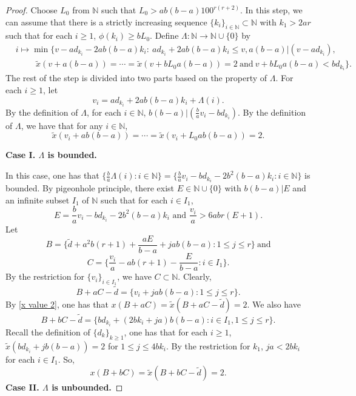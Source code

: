 \documentclass[reqno,12pt]{amsart}
\def \N {\mathbb N}
\numberwithin{equation}{section}
\begin{document}
\begin{proof}
	Choose $L_0$ from $\N$ such that $L_0>ab(b-a)100^{r(r+2)}$.
	In this step, we can assume that there is a strictly increasing sequence $\{k_i\}_{i\in \N}\subset \N$ with $k_1>2ar$ such that for each $i\ge 1$, $\phi(k_i)\ge bL_0$. Define $\Lambda:\N\to\N\cup \{0\}$ by
	\begin{align*}
		& i\mapsto\min\{v-ad_{k_i}-2ab(b-a)k_i:\ ad_{k_i}+2ab(b-a)k_i\le v, a(b-a)|(v-ad_{k_i}),
		\\ & \hspace{1cm} \tilde{x}(v+a(b-a))=\cdots=\tilde{x}(v+bL_0a(b-a))=2\ \text{and}\ v+bL_0a(b-a)<bd_{k_i}\}.
	\end{align*}	
	The rest of the step is divided into two parts based on the property of $\Lambda$.
For each $i\ge 1$, let \begin{equation}\label{de of v}v_{i}=ad_{k_i}+2ab(b-a)k_i+\Lambda(i).
 \end{equation}By the definition of $\Lambda$, for each $i\in\N$,  $b(b-a)|(\frac{b}{a}v_{i}-bd_{k_i})$. By the definition of $\Lambda$, we have that for any $i\in \N$,
\begin{equation}\label{x value 2}\tilde{x}(v_i+ab(b-a))=\cdots=\tilde{x}(v_{i}+L_{0}ab(b-a))=2.\end{equation}

\noindent \textbf{Case I. $\Lambda$ is bounded.}

In this case, one has that $\{\frac{b}{a}\Lambda(i):i\in \N\}=\{\frac{b}{a}v_{i}-bd_{k_i}-2b^{2}(b-a)k_i:i\in \N\}$ is bounded. By pigeonhole principle, there exist $E\in \N\cup \{0\}$ with $b(b-a)|E$ and an infinite subset $I_1$ of $\N$ such that for each $i\in I_1$,
$$E=\frac{b}{a}v_{i}-bd_{k_i}-2b^{2}(b-a)k_i\text{ and }\frac{v_{i}}{a}>6abr(E+1).$$
	Let $$B=\Big\{\tilde{d}+a^{2}b(r+1)+\frac{aE}{b-a}+jab(b-a):1\le j\le r\Big\}\ \text{and}$$ $$C=\Big\{\frac{v_{i}}{a}-ab(r+1)-\frac{E}{b-a}:i\in I_1\Big\}.$$
By the restriction for $\{v_i\}_{i\in I_1}$, we have $C\subset \N$. Clearly,
$$B+aC-\tilde{d}=\{v_{i}+jab(b-a):1\leq j\leq r\}.$$
By \eqref{x value 2}, one has that $x(B+aC)=\tilde{x}(B+aC-\tilde{d})=2$.
We also have
$$B+bC-\tilde{d}=\{bd_{k_i}+(2bk_i+ja)b(b-a):i\in I_1,1\leq j\leq r\}.$$ Recall the definition of $\{d_k\}_{k\ge 1}$, one has that for each $i\ge1$, $\tilde{x}(bd_{k_i}+jb(b-a))=2 $ for $1\leq j\leq 4bk_i$. By the restriction for $k_1$, $ja<2bk_i$ for each $i\in I_1$.
So,
$$x(B+bC)=\tilde{x}(B+bC-\tilde{d})=2.$$
	\noindent \textbf{Case II. $\Lambda$ is unbounded.}
	

\end{proof}
\end{document}
